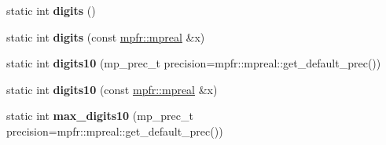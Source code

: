 \begin{DoxyCompactItemize}
\item 
\mbox{\label{classstd_1_1numeric__limits_3_01mpfr_1_1mpreal_01_4_a3934cff230bb0e9121edf616b6d0627d}} 
static int {\bfseries digits} ()
\item 
\mbox{\label{classstd_1_1numeric__limits_3_01mpfr_1_1mpreal_01_4_ae43ca4f8653896a6306c6696d0573c76}} 
static int {\bfseries digits} (const \hyperlink{classmpfr_1_1mpreal}{mpfr\+::mpreal} \&x)
\item 
\mbox{\label{classstd_1_1numeric__limits_3_01mpfr_1_1mpreal_01_4_a3ec324d8e12c98e0dcb7231db0e907c1}} 
static int {\bfseries digits10} (mp\+\_\+prec\+\_\+t precision=mpfr\+::mpreal\+::get\+\_\+default\+\_\+prec())
\item 
\mbox{\label{classstd_1_1numeric__limits_3_01mpfr_1_1mpreal_01_4_aec3df84a2ca0c42972490a0d05185b71}} 
static int {\bfseries digits10} (const \hyperlink{classmpfr_1_1mpreal}{mpfr\+::mpreal} \&x)
\item 
\mbox{\label{classstd_1_1numeric__limits_3_01mpfr_1_1mpreal_01_4_a6f91262332374ef656622ed298bf001e}} 
static int {\bfseries max\+\_\+digits10} (mp\+\_\+prec\+\_\+t precision=mpfr\+::mpreal\+::get\+\_\+default\+\_\+prec())
\end{DoxyCompactItemize}
